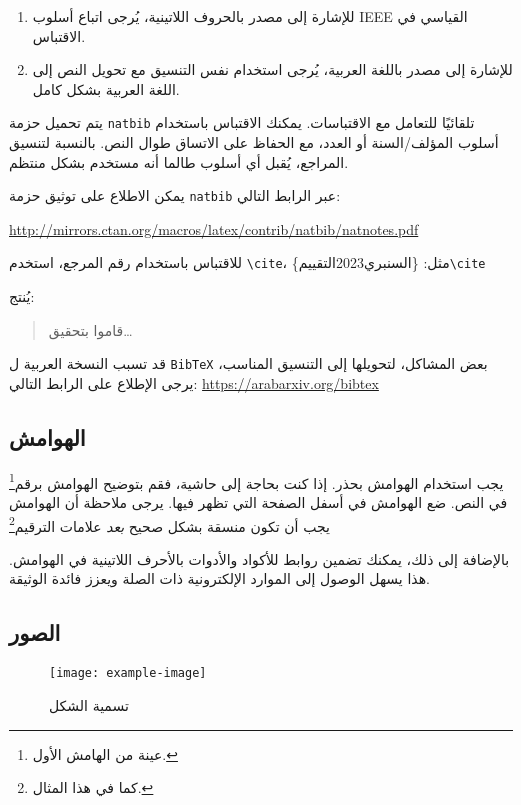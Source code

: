 \documentclass[12pt]{article}
\begin{document}
\begin{enumerate}
  \item للإشارة إلى مصدر بالحروف اللاتينية، يُرجى اتباع أسلوب IEEE القياسي في الاقتباس.
  \item للإشارة إلى مصدر باللغة العربية، يُرجى استخدام نفس التنسيق مع تحويل النص إلى اللغة العربية بشكل كامل.
\end{enumerate}

يتم تحميل حزمة \verb|natbib| تلقائيًا للتعامل مع الاقتباسات. يمكنك الاقتباس باستخدام أسلوب المؤلف/السنة أو العدد، مع الحفاظ على الاتساق طوال النص. بالنسبة لتنسيق المراجع، يُقبل أي أسلوب طالما أنه مستخدم بشكل منتظم.

يمكن الاطلاع على توثيق حزمة \verb|natbib| عبر الرابط التالي:
\begin{center}
\url{http://mirrors.ctan.org/macros/latex/contrib/natbib/natnotes.pdf}
\end{center}


للاقتباس باستخدام رقم المرجع، استخدم \verb|\cite|، مثل:
\{\textarabic{السنبري2023التقييم}\}\verb|\cite|

يُنتج:
\begin{quote}
\cite{السنبري2023التقييم} قاموا بتحقيق\dots
\end{quote}

قد تسبب النسخة العربية ل \verb|BibTeX| بعض المشاكل، لتحويلها إلى التنسيق المناسب، يرجى الإطلاع على الرابط التالي: 
\url{https://arabarxiv.org/bibtex}

\subsection{الهوامش}
يجب استخدام الهوامش بحذر. إذا كنت بحاجة إلى حاشية، فقم بتوضيح الهوامش برقم\footnote{عينة من الهامش الأول.} في النص. ضع الهوامش في أسفل الصفحة التي تظهر فيها. يرجى ملاحظة أن الهوامش يجب أن تكون منسقة بشكل صحيح \emph{بعد} علامات الترقيم\footnote{كما في هذا المثال.}

بالإضافة إلى ذلك، يمكنك تضمين روابط للأكواد والأدوات بالأحرف اللاتينية في الهوامش. هذا يسهل الوصول إلى الموارد الإلكترونية ذات الصلة ويعزز فائدة الوثيقة.

\subsection{الصور}

\begin{figure}[ht]
\centering
\texttt{[image: example-image]}
\caption{\textarabic{تسمية الشكل}}
\end{figure}
\end{document}
